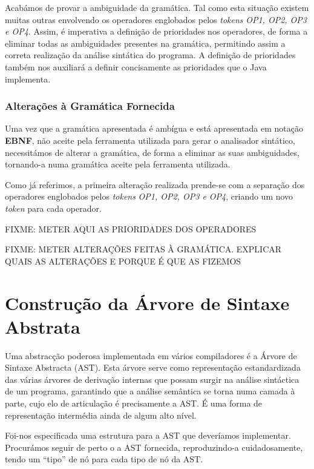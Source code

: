 \documentclass[11pt,a4paper]{article}
\begin{document}
Acabámos de provar a ambiguidade da gramática. Tal como esta situação existem muitas outras envolvendo os operadores englobados pelos \emph{tokens} \emph{OP1, OP2, OP3 e OP4}. Assim, é imperativa a definição de prioridades nos operadores, de forma a eliminar todas as ambiguidades presentes na gramática, permitindo assim a correta realização da análise sintática do programa. A definição de prioridades também nos auxiliará a definir concisamente as prioridades que o Java implementa.

\subsubsection{Alterações à Gramática Fornecida}

Uma vez que a gramática apresentada é ambígua e está apresentada em notação \textbf{EBNF}, não aceite pela ferramenta utilizada para gerar o analisador sintático, necessitámos de alterar a gramática, de forma a eliminar as suas ambiguidades, tornando-a numa gramática aceite pela ferramenta utilizada.

Como já referimos, a primeira alteração realizada prende-se com a separação dos operadores englobados pelos \emph{tokens} \emph{OP1, OP2, OP3 e OP4}, criando um novo \emph{token} para cada operador.

FIXME: METER AQUI AS PRIORIDADES DOS OPERADORES


FIXME: METER ALTERAÇÕES FEITAS À GRAMÁTICA. EXPLICAR QUAIS AS ALTERAÇÕES E PORQUE É QUE AS FIZEMOS

\pagebreak

\section{Construção da Árvore de Sintaxe Abstrata}

Uma abstracção poderosa implementada em vários compiladores é a Árvore de Sintaxe Abstracta (AST). Esta árvore serve como representação estandardizada das várias árvores de derivação internas que possam surgir na análise sintáctica de um programa, garantindo que a análise semântica se torna numa camada à parte, cujo elo de articulação é precisamente a AST. É uma forma de representação intermédia ainda de algum alto nível.

Foi-nos especificada uma estrutura para a AST que deveríamos implementar. Procurámos seguir de perto o a AST fornecida, reproduzindo-a cuidadosamente, tendo um ``tipo'' de nó para cada tipo de nó da AST.
\end{document}
